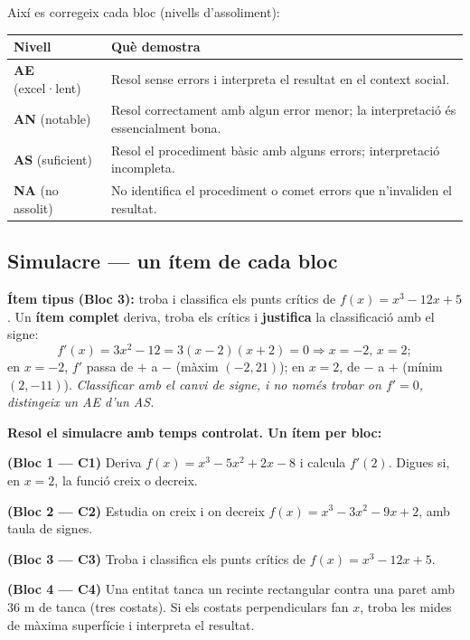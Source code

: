 \noindent Així es corregeix cada bloc (nivells d'assoliment):
\begin{center}
\renewcommand{\arraystretch}{1.3}
\begin{tabular}{p{2.4cm} p{10.2cm}}
\toprule
\textbf{Nivell} & \textbf{Què demostra} \\
\midrule
\textbf{AE} (excel·lent) & Resol sense errors i interpreta el resultat en el context
social. \\
\textbf{AN} (notable) & Resol correctament amb algun error menor; la interpretació és
essencialment bona. \\
\textbf{AS} (suficient) & Resol el procediment bàsic amb alguns errors; interpretació
incompleta. \\
\textbf{NA} (no assolit) & No identifica el procediment o comet errors que
n'invaliden el resultat. \\
\bottomrule
\end{tabular}
\end{center}

\subsection{Simulacre — un ítem de cada bloc}

\begin{exemple}
\textbf{Ítem tipus (Bloc 3):} troba i classifica els punts crítics de
$f(x)=x^3-12x+5$. Un \textbf{ítem complet} deriva, troba els crítics i \textbf{justifica}
la classificació amb el signe:
\[
f'(x)=3x^2-12=3(x-2)(x+2)=0 \Rightarrow x=-2,\,x=2;
\]
en $x=-2$, $f'$ passa de $+$ a $-$ (màxim $(-2,21)$); en $x=2$, de $-$ a $+$ (mínim
$(2,-11)$). \emph{Classificar amb el canvi de signe, i no només trobar on $f'=0$,
distingeix un AE d'un AS.}
\end{exemple}

\begin{exercicis}
\textbf{Resol el simulacre amb temps controlat. Un ítem per bloc:}
\begin{exlist}
  \item \textbf{(Bloc 1 — C1)} Deriva $f(x)=x^3-5x^2+2x-8$ i calcula $f'(2)$. Digues si,
        en $x=2$, la funció creix o decreix.
  \item \textbf{(Bloc 2 — C2)} Estudia on creix i on decreix $f(x)=x^3-3x^2-9x+2$, amb
        taula de signes.
  \item \textbf{(Bloc 3 — C3)} Troba i classifica els punts crítics de $f(x)=x^3-12x+5$.
  \item \textbf{(Bloc 4 — C4)} Una entitat tanca un recinte rectangular contra una paret
        amb $36$ m de tanca (tres costats). Si els costats perpendiculars fan $x$, troba
        les mides de màxima superfície i interpreta el resultat.
\end{exlist}
\end{exercicis}


